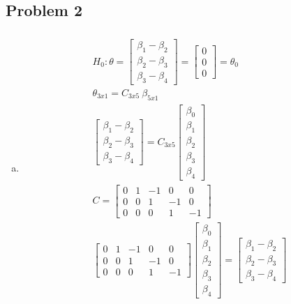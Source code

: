 \documentclass{article}
\newcommand{\B}{\beta}
\begin{document}
\begin{flushleft}
	\section*{Problem 2}
\begin{enumerate}[(a)]
	
	\item 
\begin{multline*}\\
H_0:\theta=\left[\begin{array}{r}
\B_1-\B_2\\
\B_2-\B_3\\
\B_3-\B_4
\end{array}\right]=\left[\begin{array}{r}
0\\
0\\
0
\end{array}\right]=\theta_0\\
\theta_{3x1}=C_{3x5} \ \B_{5x1}\\
\left[\begin{array}{r}
\B_1-\B_2\\
\B_2-\B_3\\
\B_3-\B_4
\end{array}\right]=C_{3x5} \left[\begin{array}{r}
\B_0\\
\B_1\\
\B_2\\
\B_3\\
\B_4
\end{array}\right]\\
C=\left[\begin{array}{rrrrr}
0&1&-1&0&0\\
0&0&1&-1&0\\
0&0&0&1&-1
\end{array}\right]\\
\left[\begin{array}{rrrrr}
0&1&-1&0&0\\
0&0&1&-1&0\\
0&0&0&1&-1
\end{array}\right]\left[\begin{array}{r}
\B_0\\
\B_1\\
\B_2\\
\B_3\\
\B_4
\end{array}\right]=\left[\begin{array}{r}
\B_1-\B_2\\
\B_2-\B_3\\
\B_3-\B_4
\end{array}\right]\\
\end{multline*}


\end{enumerate}
\end{flushleft}
\end{document}
